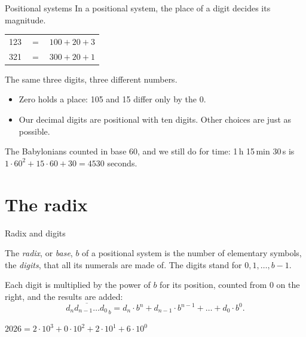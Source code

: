 \documentclass[10pt]{wosm-slides}
\begin{document}
\begin{frame}{Positional systems}
  In a positional system, the \alert{place} of a digit decides its magnitude.

  \medskip
  \begin{center}
    \begin{tabular}{@{}r@{\quad}c@{\quad}l@{}}
      123 & $=$ & $100 + 20 + 3$ \\
      321 & $=$ & $300 + 20 + 1$ \\
    \end{tabular}
  \end{center}
  The same three digits, three different numbers.
  \begin{itemize}
    \item Zero holds a place: 105 and 15 differ only by the 0.
    \item Our decimal digits are positional with ten digits. Other choices are just
      as possible.
  \end{itemize}

  \begin{example}
    The Babylonians counted in base 60, and we still do for time:
    1\,h 15\,min 30\,s is $1 \cdot 60^2 + 15 \cdot 60 + 30 = 4530$ seconds.
  \end{example}
\end{frame}

\section{The radix}

\begin{frame}{Radix and digits}
  \begin{definition}[Radix]
    The \emph{radix}, or \emph{base}, $b$ of a positional system is the number of
    elementary symbols, the \emph{digits}, that all its numerals are made of. The
    digits stand for $0, 1, \dots, b - 1$.
  \end{definition}

  Each digit is multiplied by the power of $b$ for its position, counted from 0 on
  the right, and the results are added:
  \[
    \overline{d_n d_{n-1} \dots d_0}_{\,b}
      = d_n \cdot b^n + d_{n-1} \cdot b^{n-1} + \dots + d_0 \cdot b^0 .
  \]

  \begin{example}[Decimal, $b = 10$]
    $2026 = 2 \cdot 10^3 + 0 \cdot 10^2 + 2 \cdot 10^1 + 6 \cdot 10^0$
  \end{example}
\end{frame}
\end{document}
